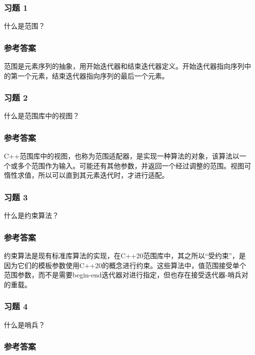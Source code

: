 \subsubsection{习题 1}

什么是范围？

\subsubsection{参考答案}

范围是元素序列的抽象，用开始迭代器和结束迭代器定义。开始迭代器指向序列中的第一个元素，结束迭代器指向序列的最后一个元素。


\subsubsection{习题 2}

什么是范围库中的视图？

\subsubsection{参考答案}

C++范围库中的视图，也称为范围适配器，是实现一种算法的对象，该算法以一个或多个范围作为输入。可能还有其他参数，并返回一个经过调整的范围。视图可惰性求值，所以可以直到其元素迭代时，才进行适配。

\subsubsection{习题 3}

什么是约束算法？

\subsubsection{参考答案}

约束算法是现有标准库算法的实现，在C++20范围库中，其之所以“受约束”，是因为它们的模板参数使用C++20的概念进行约束。这些算法中，值范围接受单个范围参数，而不是需要begin-end迭代器对进行指定，但也存在接受迭代器-哨兵对的重载。

\subsubsection{习题 4}

什么是哨兵？

\subsubsection{参考答案}

